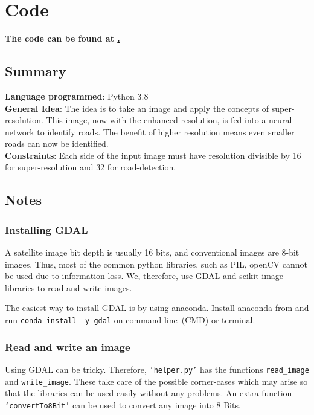 \chapter{Code}\label{chapt:code}
\textbf{The code can be found at \href{https://nautatva.github.io/btp/code/}.}

\section{Summary}
\textbf{Language programmed}: Python 3.8 \bigskip \\
\textbf{General Idea}: The idea is to take an image and apply the concepts of super-resolution. This image, now with the enhanced resolution, is fed into a neural network to identify roads. The benefit of higher resolution means even smaller roads can now be identified. \bigskip \\
\textbf{Constraints}: Each side of the input image must have resolution divisible by 16 for super-resolution and 32 for road-detection.


\section{Notes}
\subsection{Installing GDAL}
A satellite image bit depth is usually 16 bits, and conventional images are 8-bit images. Thus, most of the common python libraries, such as PIL, openCV cannot be used due to information loss. We, therefore, use GDAL and scikit-image libraries to read and write images.

The easiest way to install GDAL is by using anaconda. Install anaconda from \href{https://www.anaconda.com/products/individual#Downloads} and run \texttt{conda install -y gdal} on command line~(CMD) or terminal.


\subsection{Read and write an image}
Using GDAL can be tricky. Therefore, \texttt{`helper.py'} has the functions \texttt{read\_image} and \texttt{write\_image}. These take care of the possible corner-cases which may arise so that the libraries can be used easily without any problems. An extra function \texttt{`convertTo8Bit'} can be used to convert any image into 8 Bits.

